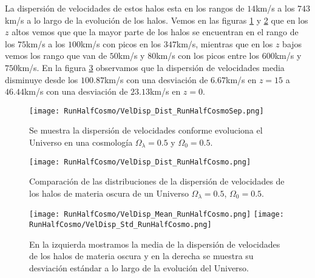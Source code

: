 La dispersión de velocidades de estos halos esta en los rangos de $14$km/s a los $743$km/s a lo largo de la evolución de los halos. Vemos en las figuras \ref{fig:HalfCosmo-VelDispDistSep} y \ref{fig:HalfCosmo-VelDispDist} que en los $z$ altos vemos que que la mayor parte de los halos se encuentran en el rango de los $75$km/s a los $100$km/s con picos en los $347$km/s, mientras que en los $z$ bajos vemos los rango que van de $50$km/s y $80$km/s con los picos entre los $600$km/s y $750$km/s. En la figura \ref{fig:HalfCosmo-VelDispStats} observamos que la dispersión de velocidades media disminuye desde los $100.87$km/s con una desviación de $6.67$km/s en $z=15$ a $46.44$km/s con una desviación de $23.13$km/s en $z=0$.

\begin{figure}[H]
    \centering
    \texttt{[image: RunHalfCosmo/VelDisp\_Dist\_RunHalfCosmoSep.png]}
    \caption[Dispersión de velocidades en la evolución de un Universo $\Omega_\lambda = 0.5 $, $\Omega_0 = 0.5$]{\footnotesize Se muestra la dispersión de velocidades conforme evoluciona el Universo en una cosmología $\Omega_\lambda = 0.5 $ y $\Omega_0 = 0.5$.}
    \label{fig:HalfCosmo-VelDispDistSep}
\end{figure}

\begin{figure}[H]
    \centering
    \texttt{[image: RunHalfCosmo/VelDisp\_Dist\_RunHalfCosmo.png]}
    \caption[Distribución de la dispersión de velocidades de un Universo $\Omega_\lambda = 0.5 $, $\Omega_0 = 0.5$]{\footnotesize Comparación de las distribuciones de la dispersión de velocidades de los halos de materia oscura de un Universo $\Omega_\lambda = 0.5 $, $\Omega_0 = 0.5$.}
    \label{fig:HalfCosmo-VelDispDist}
\end{figure}

\begin{figure}[H]
    \centering
    \texttt{[image: RunHalfCosmo/VelDisp\_Mean\_RunHalfCosmo.png]}
    \texttt{[image: RunHalfCosmo/VelDisp\_Std\_RunHalfCosmo.png]}
    \caption[Media y desviación estándar de la dispersión de velocidades de un Universo $\Omega_\lambda = 0.5 $, $\Omega_0 = 0.5$]{\footnotesize En la izquierda mostramos la media de la dispersión de velocidades de los halos de materia oscura y en la derecha se muestra su desviación estándar a lo largo de la evolución del Universo.}
    \label{fig:HalfCosmo-VelDispStats}
\end{figure}

